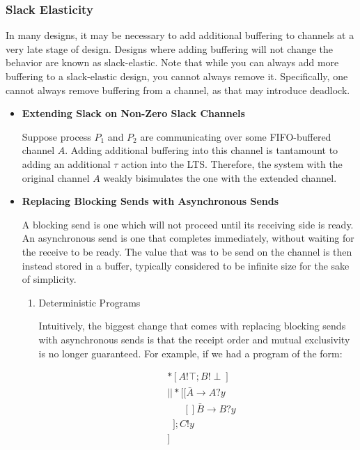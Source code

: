 \documentclass[times, 10pt]{article}
\begin{document}
\subsubsection{Slack Elasticity}

In many designs, it may be necessary to add additional buffering to channels at
a very late stage of design. Designs where adding buffering will not change the
behavior are known as slack-elastic. Note that while you can always add more
buffering to a slack-elastic design, you cannot always remove it. Specifically,
one cannot always remove buffering from a channel, as that may introduce
deadlock.

\begin{itemize}

\item {\bf Extending Slack on Non-Zero Slack Channels}

Suppose process $P_1$ and $P_2$ are communicating over some FIFO-buffered
channel $A$.  Adding additional buffering into this channel is tantamount to
adding an additional $\tau$ action into the LTS.  Therefore, the system with the
original channel $A$ weakly bisimulates the one with the extended channel. 

\item {\bf Replacing Blocking Sends with Asynchronous Sends}

A blocking send is one which will not proceed until its receiving side is ready.
An asynchronous send is one that completes immediately, without waiting for the
receive to be ready. The value that was to be send on the channel is then
instead stored in a buffer, typically considered to be infinite size for the
sake of simplicity.

\begin{enumerate}

\item Deterministic Programs

Intuitively, the biggest change that comes with replacing blocking sends with
asynchronous sends is that the receipt order and mutual exclusivity is no longer
guaranteed.  For example, if we had a program of the form:

\begin{align*}
&*[A!\top; B!\!\perp] \\
&|| *[[ \bar{A} \rightarrow A?y \\
&\;\;\;\;\;\; [] \bar{B} \rightarrow B?y \\
&\;\;]; C!y \\
&]
\end{align*}


\end{enumerate}
\end{itemize}
\end{document}
